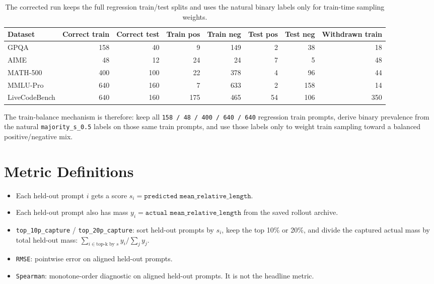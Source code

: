 \documentclass[11pt]{article}
\begin{document}
\begin{table}[h]
\centering
\small
\begin{tabular}{lrrrrrrr}
\toprule
Dataset & Correct train & Correct test & Train pos & Train neg & Test pos & Test neg & Withdrawn train \\
\midrule
GPQA & 158 & 40 & 9 & 149 & 2 & 38 & 18 \\
AIME & 48 & 12 & 24 & 24 & 7 & 5 & 48 \\
MATH-500 & 400 & 100 & 22 & 378 & 4 & 96 & 44 \\
MMLU-Pro & 640 & 160 & 7 & 633 & 2 & 158 & 14 \\
LiveCodeBench & 640 & 160 & 175 & 465 & 54 & 106 & 350 \\
\bottomrule
\end{tabular}
\caption{The corrected run keeps the full regression train/test splits and uses the natural binary labels only for train-time sampling weights.}
\end{table}

The train-balance mechanism is therefore: keep all
\texttt{158 / 48 / 400 / 640 / 640} regression train prompts, derive binary
prevalence from the natural \texttt{majority\_s\_0.5} labels on those same train
prompts, and use those labels only to weight train sampling toward a balanced
positive/negative mix.

\section{Metric Definitions}

\begin{itemize}
\item Each held-out prompt $i$ gets a score $s_i = \texttt{predicted mean\_relative\_length}$.
\item Each held-out prompt also has mass $y_i = \texttt{actual mean\_relative\_length}$ from the saved rollout archive.
\item \texttt{top\_10p\_capture} / \texttt{top\_20p\_capture}: sort held-out prompts by $s_i$, keep the top 10\% or 20\%, and divide the captured actual mass by total held-out mass: $\sum_{i \in \text{top-k by } s} y_i / \sum_j y_j$.
\item \texttt{RMSE}: pointwise error on aligned held-out prompts.
\item \texttt{Spearman}: monotone-order diagnostic on aligned held-out prompts. It is not the headline metric.
\end{itemize}
\end{document}
